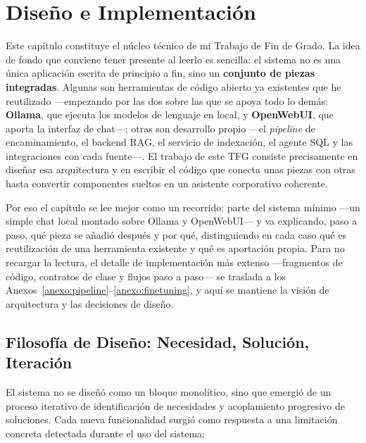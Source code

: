\chapter{Diseño e Implementación}
\label{cap:implementacion}

Este capítulo constituye el núcleo técnico de mi Trabajo de Fin de Grado. La idea de fondo que conviene tener presente al leerlo es sencilla: el sistema no es una única aplicación escrita de principio a fin, sino un \textbf{conjunto de piezas integradas}. Algunas son herramientas de código abierto ya existentes que he reutilizado ---empezando por las dos sobre las que se apoya todo lo demás: \textbf{Ollama}, que ejecuta los modelos de lenguaje en local, y \textbf{OpenWebUI}, que aporta la interfaz de chat---; otras son desarrollo propio ---el \textit{pipeline} de encaminamiento, el backend RAG, el servicio de indexación, el agente SQL y las integraciones con cada fuente---. El trabajo de este TFG consiste precisamente en diseñar esa arquitectura y en escribir el código que conecta unas piezas con otras hasta convertir componentes sueltos en un asistente corporativo coherente.

Por eso el capítulo se lee mejor como un recorrido: parte del sistema mínimo ---un simple chat local montado sobre Ollama y OpenWebUI--- y va explicando, paso a paso, qué pieza se añadió después y por qué, distinguiendo en cada caso qué es reutilización de una herramienta existente y qué es aportación propia. Para no recargar la lectura, el detalle de implementación más extenso ---fragmentos de código, contratos de clase y flujos paso a paso--- se traslada a los Anexos~\ref{anexo:pipeline}--\ref{anexo:finetuning}, y aquí se mantiene la visión de arquitectura y las decisiones de diseño.

\section{Filosofía de Diseño: Necesidad, Solución, Iteración}
\label{sec:filosofia}

El sistema no se diseñó como un bloque monolítico, sino que emergió de un proceso iterativo de identificación de necesidades y acoplamiento progresivo de soluciones. Cada nueva funcionalidad surgió como respuesta a una limitación concreta detectada durante el uso del sistema:


